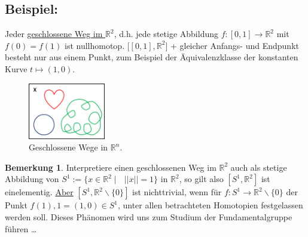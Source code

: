\documentclass[a4paper,11pt,notitlepage]{report}
\theoremstyle{definition}
\newtheorem{remark}{Bemerkung}[chapter]
\newcommand{\R}{{\ensuremath{\mathbb{R}}}}
\newenvironment{bsp}[1]
{
\setlength{\fboxsep}{10pt}
\subsection*{Beispiel: #1}
\begin{upshape}
}
{
\end{upshape}
}
\begin{document}
\begin{bsp}{}
Jeder \underline{geschlossene Weg im $\R^2$}, d.h. jede stetige Abbildung $f \colon [0,1] \rightarrow \R^2$ mit $f(0) = f(1)$ ist nullhomotop.
$\bigl[[0,1], \R^2\bigr]$ + gleicher Anfangs- und Endpunkt besteht nur aus einem Punkt, zum Beispiel der Äquivalenzklasse der konstanten Kurve $t \mapsto (1,0)$.

\begin{figure}[h]
\centering
\includegraphics[width=0.3\textwidth]{images/Geschlossene_Wege.png}
\caption{Geschlossene Wege in $\R^n$.}
\end{figure}

\begin{remark}{}\label{nichttrivial}
Interpretiere einen geschlossenen Weg im $\R^2$ auch als stetige Abbildung von $S^1 := \{ x \in \R^2 \mid \text{ } ||x|| = 1\}$ in $\R^2$, so gilt also $[S^1, \R^2]$ ist einelementig.
\newline
\underline{Aber} $[S^1, \R^2 \backslash \{0\}]$ ist nichttrivial, wenn für $f \colon S^1 \rightarrow \R^2 \backslash \{0\}$ der Punkt $f(1), 1 = (1,0) \in S^1$, unter allen betrachteten Homotopien festgelassen werden soll. Dieses Phänomen wird uns zum Studium der Fundamentalgruppe führen \ldots
\end{remark}


\end{bsp}
\end{document}
